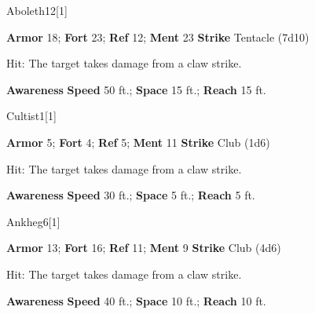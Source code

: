 \begin{monsection}{Aboleth}{12}[1]
\begin{spellcontent}
\begin{spelltargetinginfo}
\pari \textbf{Armor} 18; \textbf{Fort} 23; \textbf{Ref} 12; \textbf{Ment} 23
\pari \textbf{Strike} Tentacle  (7d10)
\end{spelltargetinginfo}
\begin{spelleffects}
\pari {}
\par Hit: The target takes damage from a claw strike.
\end{spelleffects}
\end{spellcontent}
\begin{spellfooter}
\pari \textbf{Awareness} 
\pari \textbf{Speed} 50 ft.; \textbf{Space} 15 ft.; \textbf{Reach} 15 ft.
\end{spellfooter}
\end{monsection}
\begin{monsection}{Cultist}{1}[1]
\begin{spellcontent}
\begin{spelltargetinginfo}
\pari \textbf{Armor} 5; \textbf{Fort} 4; \textbf{Ref} 5; \textbf{Ment} 11
\pari \textbf{Strike} Club  (1d6)
\end{spelltargetinginfo}
\begin{spelleffects}
\pari {}
\par Hit: The target takes damage from a claw strike.
\end{spelleffects}
\end{spellcontent}
\begin{spellfooter}
\pari \textbf{Awareness} 
\pari \textbf{Speed} 30 ft.; \textbf{Space} 5 ft.; \textbf{Reach} 5 ft.
\end{spellfooter}
\end{monsection}
\begin{monsection}{Ankheg}{6}[1]
\begin{spellcontent}
\begin{spelltargetinginfo}
\pari \textbf{Armor} 13; \textbf{Fort} 16; \textbf{Ref} 11; \textbf{Ment} 9
\pari \textbf{Strike} Club  (4d6)
\end{spelltargetinginfo}
\begin{spelleffects}
\pari {}
\par Hit: The target takes damage from a claw strike.
\end{spelleffects}
\end{spellcontent}
\begin{spellfooter}
\pari \textbf{Awareness} 
\pari \textbf{Speed} 40 ft.; \textbf{Space} 10 ft.; \textbf{Reach} 10 ft.
\end{spellfooter}
\end{monsection}
